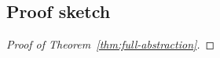 \documentclass[acmsmall,review,anonymous]{acmart}\settopmatter{printfolios=true,printccs=false,printacmref=false}
\begin{document}
\subsection{Proof sketch}
\begin{proof}[Proof of Theorem~\ref{thm:full-abstraction}]






\end{proof}
\end{document}
